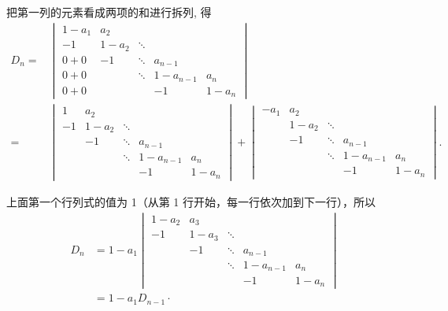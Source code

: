 \documentclass[UTF8,12pt,a4paper,fontset=fandol]{ctexart}
\begin{document}
\begin{solve}
把第一列的元素看成两项的和进行拆列, 得
    \begin{align*}
        D_n= & \begin{vmatrix}
                   1-a_{1} & a_{2}   &        &           &         \\
                   -1      & 1-a_{2} & \ddots &           &         \\
                   0 + 0   & -1      & \ddots & a_{n-1}   &         \\
                   0 + 0   &         & \ddots & 1-a_{n-1} & a_{n}   \\
                   0 + 0   &         &        & -1        & 1-a_{n}
               \end{vmatrix}                \\
        =    & \begin{vmatrix}
                   1  & a_{2}   &        &           &         \\
                   -1 & 1-a_{2} & \ddots &           &         \\
                      & -1      & \ddots & a_{n-1}   &         \\
                      &         & \ddots & 1-a_{n-1} & a_{n}   \\
                      &         &        & -1        & 1-a_{n}
               \end{vmatrix} + \begin{vmatrix}
                                   -a_{1} & a_{2}   &        &           &         \\
                                          & 1-a_{2} & \ddots &           &         \\
                                          & -1      & \ddots & a_{n-1}   &         \\
                                          &         & \ddots & 1-a_{n-1} & a_{n}   \\
                                          &         &        & -1        & 1-a_{n}
                               \end{vmatrix}.
    \end{align*}

    上面第一个行列式的值为 1（从第 1 行开始，每一行依次加到下一行），所以
    \[ \begin{aligned}
            D_n & =1-a_{1}\begin{vmatrix}
                              1-a_{2} & a_{3}   &        &           &         \\
                              -1      & 1-a_{3} & \ddots &           &         \\
                                      & -1      & \ddots & a_{n-1}   &         \\
                                      &         & \ddots & 1-a_{n-1} & a_{n}   \\
                                      &         &        & -1        & 1-a_{n}
                          \end{vmatrix} \\
                & =1-a_{1} D_{n-1} \cdot
        \end{aligned} \]


\end{solve}
\end{document}
